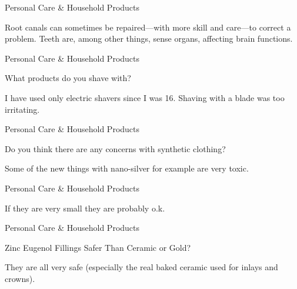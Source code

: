 \documentclass[11pt,oneside,openany,extrafontsizes]{memoir}
\begin{document}
\begin{standalonequote}{Personal Care \& Household Products}

    \begin{answer}
      Root canals can sometimes be repaired—with more skill and care—to correct a problem. Teeth are, among other things, sense organs, affecting brain functions.
    \end{answer}
\end{standalonequote}

\begin{qaexchange}{Personal Care \& Household Products}

    \begin{question}
        What products do you shave with? 
    \end{question}

    \begin{answer}
      I have used only electric shavers since I was 16. Shaving with a blade was too irritating.
    \end{answer}
\end{qaexchange}

\begin{qaexchange}{Personal Care \& Household Products}

    \begin{question}
        Do you think there are any concerns with synthetic clothing?
    \end{question}

    \begin{answer}
      Some of the new things with nano-silver for example are very toxic.
    \end{answer}
\end{qaexchange}

\begin{standalonequote}{Personal Care \& Household Products}

    \begin{answer}
      If they are very small they are probably o.k.
    \end{answer}
\end{standalonequote}

\begin{standalonequote}{Personal Care \& Household Products}

    \begin{note}
        Zinc Eugenol Fillings Safer Than Ceramic or Gold?
    \end{note}

    \begin{answer}
      They are all very safe (especially the real baked ceramic used for inlays and crowns).
    \end{answer}
\end{standalonequote}
\end{document}
